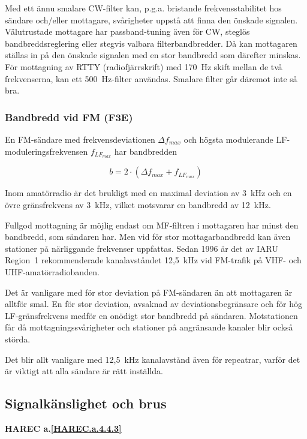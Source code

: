 Med ett ännu smalare CW-filter kan, p.g.a. bristande frekvensstabilitet hos
sändare och/eller mottagare, svårigheter uppstå att finna den önskade signalen.
Välutrustade mottagare har passband-tuning även för CW, steglös
bandbreddsreglering eller stegvis valbara filterbandbredder.
Då kan mottagaren ställas in på den önskade signalen med en stor bandbredd
som därefter minskas.
För mottagning av RTTY (radiofjärrskrift) med 170~Hz skift mellan de två
frekvenserna, kan ett 500~Hz-filter användas.
Smalare filter går däremot inte så bra.

\subsubsection{Bandbredd vid FM (F3E)}

En FM-sändare med frekvensdeviationen \(\Delta f_{max}\) och högsta
modulerande LF-moduleringsfrekvensen \(f_{LF_{max}}\) har bandbredden

\[ b = 2 \cdot (\Delta f_{max} + f_{LF_{max}}) \]

Inom amatörradio är det brukligt med en maximal deviation av 3~kHz och
en övre gränsfrekvens av 3~kHz, vilket motsvarar en bandbredd av 12~kHz.

Fullgod mottagning är möjlig endast om MF-filtren i mottagaren har
minst den bandbredd, som sändaren har.
Men vid för stor mottagarbandbredd kan även stationer på närliggande frekvenser
uppfattas.
Sedan 1996 är det av IARU Region~1 rekommenderade kanalavståndet 12,5~kHz
vid FM-trafik på VHF- och UHF-amatörradiobanden.

Det är vanligare med för stor deviation på FM-sändaren än att
mottagaren är alltför smal.
En för stor deviation, avsaknad av deviationsbegränsare och för hög
LF-gränsfrekvens medför en onödigt stor bandbredd på sändaren.
Motstationen får då mottagningssvårigheter och stationer på angränsande
kanaler blir också störda.

Det blir allt vanligare med 12,5~kHz kanalavstånd även för repeatrar,
varför det är viktigt att alla sändare är rätt inställda.

\subsection{Signalkänslighet och brus}
\textbf{HAREC a.\ref{HAREC.a.4.4.3}\label{myHAREC.a.4.4.3}}

